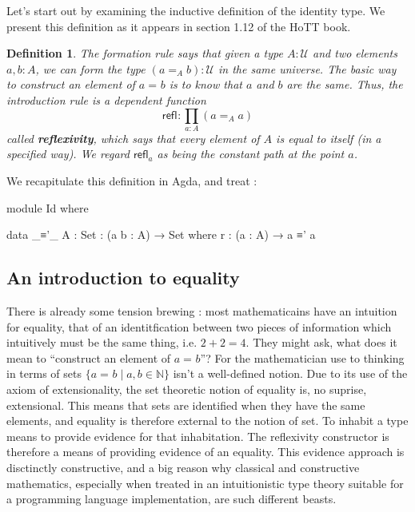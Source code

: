 \documentclass[11pt, a4paper]{article}
\newtheorem{definition}{Definition}
\newcommand{\refl}[1]{\ensuremath{\mathsf{refl}_{#1}}\xspace}
\newcommand{\define}[1]{\textbf{#1}}
\newcommand{\id}[3][]{\ensuremath{#2 =_{#1} #3}\xspace}
\newcommand{\UU}{\ensuremath{\mathcal{U}}\xspace}
\begin{document}
Let's start out by examining the inductive definition of the identity type.  We
present this definition as it appears in section 1.12 of the HoTT book.

\begin{definition}
  The formation rule says that given a type $A:\UU$ and two elements $a,b:A$, we can form the type $(\id[A]{a}{b}):\UU$ in the same universe.
  The basic way to construct an element of $\id{a}{b}$ is to know that $a$ and $b$ are the same.
  Thus, the introduction rule is a dependent function
  \[\refl{} : \prod_{a:A} (\id[A]{a}{a}) \]
  called \define{reflexivity},
  which says that every element of $A$ is equal to itself (in a specified way).  We regard $\refl{a}$ as being the
  constant path %
  at the point $a$.
\end{definition}

We recapitulate this definition in Agda, and treat : 

\begin{code}[hide]

module Id where

\end{code}
\begin{code}

  data _≡'_ {A : Set} : (a b : A) → Set where
    r : (a : A) → a ≡' a

\end{code}

\subsection{An introduction to equality}

There is already some tension brewing : most mathematicains have an intuition
for equality, that of an identitfication between two pieces of information
which intuitively must be the same thing, i.e. $2+2=4$. They might ask, what
does it mean to ``construct an element of $\id{a}{b}$''? For the mathematician
use to thinking in terms of sets $\{\id{a}{b} \mid a,b \in \mathbb{N} \}$ isn't
a well-defined notion. Due to its use of the axiom of extensionality, the set
theoretic notion of equality is, no suprise, extensional.  This means that sets
are identified when they have the same elements, and equality is therefore
external to the notion of set. To inhabit a type means to provide evidence for
that inhabitation. The reflexivity constructor is therefore a means of
providing evidence of an equality. This evidence approach is disctinctly
constructive, and a big reason why classical and constructive mathematics,
especially when treated in an intuitionistic type theory suitable for a
programming language implementation, are such different beasts.
\end{document}
